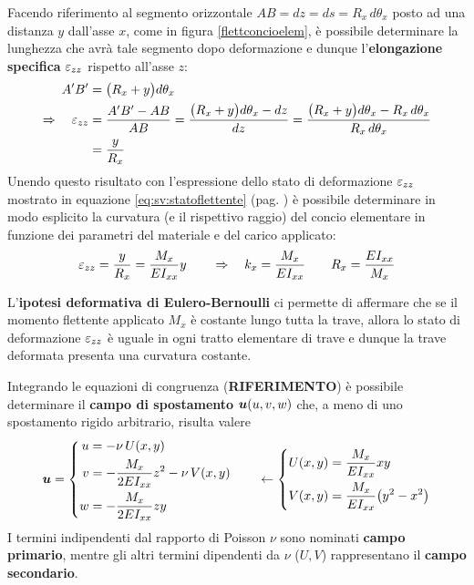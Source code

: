 		Facendo riferimento al segmento orizzontale $AB = dz = ds =R_x\, d\theta_x$ posto ad una distanza $y$ dall'asse $x$, come in figura \ref{flettconcioelem}, è possibile determinare la lunghezza che avrà tale segmento dopo deformazione e dunque l'\textbf{elongazione specifica} $\varepsilon_{zz}$ rispetto all'asse $z$:
		\begin{align*}
			A'B' & = \big(R_x + y\big) d\theta_x \\
			\Rightarrow \quad \varepsilon_{zz}  & = \frac{A'B'-AB}{AB} = \frac{\big(R_x+y\big) d\theta_x - dz }{dz} = \frac{\big(R_x + y\big)d\theta_x - R_x \, d\theta_x}{R_x \, d\theta_x} \\
			& = \frac y {R_x}
		\end{align*}
		Unendo questo risultato con l'espressione dello stato di deformazione $\varepsilon_{zz}$ mostrato in equazione \ref{eq:sv:statoflettente} (pag. \pageref{eq:sv:statoflettente}) è possibile determinare in modo esplicito la curvatura (e il rispettivo raggio) del concio elementare in funzione dei parametri del materiale e del carico applicato:
		\begin{equation}
			\varepsilon_{zz} = \frac y {R_x} =\frac {M_x} {EI_{xx}} y \qquad \Rightarrow \quad k_x = \frac {M_x}{EI_{xx}} \qquad R_x = \frac {EI_{xx}} {M_x}
		\end{equation}
		\begin{concetto}
			L'\textbf{ipotesi deformativa di Eulero-Bernoulli} ci permette di affermare che se il momento flettente applicato $M_x$ è costante lungo tutta la trave, allora lo stato di deformazione $\varepsilon_{zz}$ è uguale in ogni tratto elementare di trave e dunque la trave deformata presenta una curvatura costante.
		\end{concetto}
		\begin{concetto}
			Integrando le equazioni di congruenza (\textbf{RIFERIMENTO}) è possibile determinare il \textbf{campo di spostamento} $\boldsymbol{u}(u,v,w)$ che, a meno di uno spostamento rigido arbitrario, risulta valere
			\begin{equation} \label{eq:sv:campoflessione}
			\boldsymbol{u} = \left\{ 
			\begin{split}
				u &= -\nu \, U(x,y) \\
				v &= -\frac {M_x} {2EI_{xx}} z^2 - \nu \, V(x,y) \\
				w &= - \frac{M_x}{2EI_{xx}} zy
			\end{split}\right.
			\qquad \leftarrow \left\{ 
			\begin{split}
				U(x,y) & = \frac{M_x}{EI_{xx}} xy \\
				V(x,y) & = \frac{M_x}{EI_{xx}} \big(y^2 - x^2\big) \\
			\end{split}\right.
			\end{equation}
			I termini indipendenti dal rapporto di Poisson $\nu$ sono nominati \textbf{campo primario}, mentre gli altri termini dipendenti da $\nu$ ($U,V$) rappresentano il \textbf{campo secondario}.
		\end{concetto}
		
